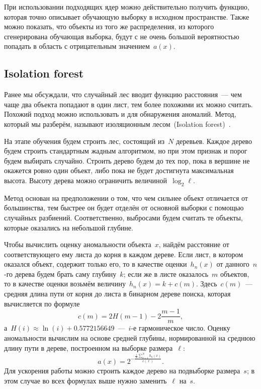 \documentclass[12pt,fleqn]{article}
\begin{document}
При использовании подходящих ядер можно действительно получить функцию, которая
точно описывает обучающую выборку в исходном пространстве.
Также можно показать, что объекты из того же распределения, из которого сгенерирована
обучающая выборка, будут с не очень большой вероятностью попадать в область
с отрицательным значением~$a(x)$.


\subsection{Isolation forest}

Ранее мы обсуждали, что случайный лес вводит функцию расстояния~--- чем чаще два объекта попадают
в один лист, тем более похожими их можно считать.
Похожий подход можно использовать и для обнаружения аномалий.
Метод, который мы разберём, называют изоляционным лесом~(Isolation forest)~\cite{liu08iforest}.

На этапе обучения будем строить лес, состоящий из~$N$ деревьев.
Каждое дерево будем строить стандартным жадным алгоритмом,
но при этом признак и порог будем выбирать случайно.
Строить дерево будем до тех пор, пока в вершине не окажется ровно один объект,
либо пока не будет достигнута максимальная высота.
Высоту дерева можно ограничить величиной~$\log_2 \ell$.

Метод основан на предположении о том, что чем сильнее объект отличается от большинства,
тем быстрее он будет отделён от основной выборки с помощью случайных разбиений.
Соответственно, выбросами будем считать те объекты, которые оказались на небольшой глубине.

Чтобы вычислить оценку аномальности объекта~$x$, найдём расстояние от соответствующего ему листа
до корня в каждом дереве.
Если лист, в котором оказался объект, содержит только его, то в качестве оценки~$h_n(x)$
от данного~$n$-го дерева будем брать саму глубину~$k$;
если же в листе оказалось~$m$ объектов, то в качестве оценки возьмём величину~$h_n(x) = k + c(m)$.
Здесь~$c(m)$~--- средняя длина пути от корня до листа в бинарном дереве поиска, которая вычисляется по формуле
\[
    c(m)
    =
    2H(m - 1) - 2\frac{m - 1}{m},
\]
а~$H(i) \approx \ln(i) + 0.5772156649$~---~$i$-е гармоническое число.
Оценку аномальности вычислим на основе средней глубины, нормированной на среднюю длину пути в дереве,
построенном на выборке размера~$\ell$:
\[
    a(x)
    =
    2^{-\frac{
            \frac{1}{N} \sum_{n = 1}^{N} h_n(x)
        }{
            c(\ell)
        }
    }.
\]
Для ускорения работы можно строить каждое дерево на подвыборке размера~$s$;
в этом случае во всех формулах выше нужно заменить~$\ell$ на~$s$.
\end{document}
